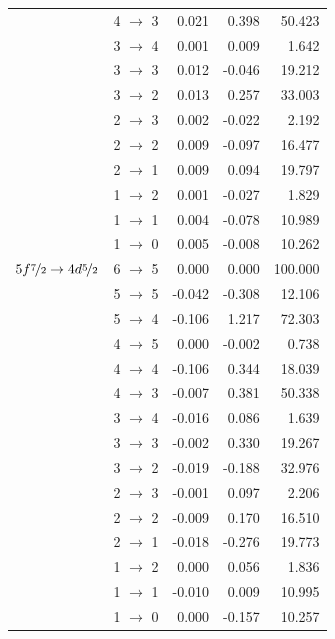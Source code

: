 \begin{table}[b]
\begin{small}
\begin{tabular}{cc|rrr}
 & 4 $\rightarrow$ 3&0.021&0.398&50.423\\
 & 3 $\rightarrow$ 4&0.001&0.009&1.642\\
 & 3 $\rightarrow$ 3&0.012&-0.046&19.212\\
 & 3 $\rightarrow$ 2&0.013&0.257&33.003\\
 & 2 $\rightarrow$ 3&0.002&-0.022&2.192\\
 & 2 $\rightarrow$ 2&0.009&-0.097&16.477\\
 & 2 $\rightarrow$ 1&0.009&0.094&19.797\\
 & 1 $\rightarrow$ 2&0.001&-0.027&1.829\\
 & 1 $\rightarrow$ 1&0.004&-0.078&10.989\\
 & 1 $\rightarrow$ 0&0.005&-0.008&10.262\\[10pt]
$5f\nicefrac{7}{2} \rightarrow 4d\nicefrac{5}{2}$ & 6 $\rightarrow$ 5&0.000&0.000&100.000\\
 & 5 $\rightarrow$ 5&-0.042&-0.308&12.106\\
 & 5 $\rightarrow$ 4&-0.106&1.217&72.303\\
 & 4 $\rightarrow$ 5&0.000&-0.002&0.738\\
 & 4 $\rightarrow$ 4&-0.106&0.344&18.039\\
 & 4 $\rightarrow$ 3&-0.007&0.381&50.338\\
 & 3 $\rightarrow$ 4&-0.016&0.086&1.639\\
 & 3 $\rightarrow$ 3&-0.002&0.330&19.267\\
 & 3 $\rightarrow$ 2&-0.019&-0.188&32.976\\
 & 2 $\rightarrow$ 3&-0.001&0.097&2.206\\
 & 2 $\rightarrow$ 2&-0.009&0.170&16.510\\
 & 2 $\rightarrow$ 1&-0.018&-0.276&19.773\\
 & 1 $\rightarrow$ 2&0.000&0.056&1.836\\
 & 1 $\rightarrow$ 1&-0.010&0.009&10.995\\
 & 1 $\rightarrow$ 0&0.000&-0.157&10.257\\
\end{tabular}
\end{small}
\end{table}%
%
%
%
